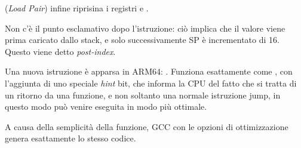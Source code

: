  (\emph{Load Pair}) infine riprisina i registri  e .

Non c'è il punto esclamativo dopo l'istruzione: ciò implica che il valore viene prima caricato dallo stack, e solo successivamente
\ac{SP} è incrementato di 16.
Questo viene detto \emph{post-index}.

Una nuova istruzione è apparsa in ARM64: \RET.
Funziona esattamente come , con l'aggiunta di uno speciale \emph{hint} bit, che informa la \ac{CPU}
del fatto che si tratta di un ritorno da una funzione, e non soltanto una normale istruzione jump, in questo modo
può venire eseguita in modo più ottimale.

A causa della semplicità della funzione, GCC con le opzioni di ottimizzazione genera esattamente lo stesso codice.
